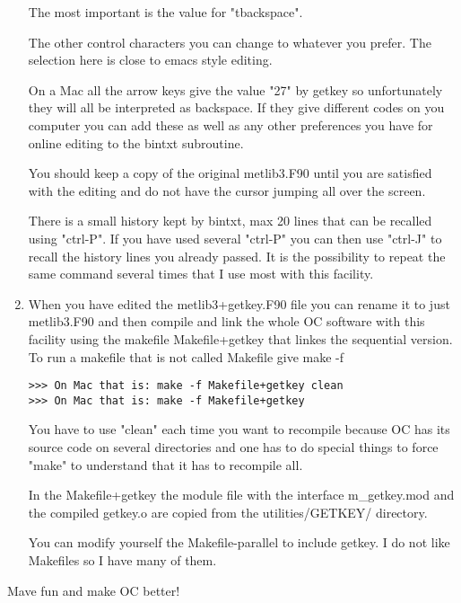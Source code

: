 \documentclass[12pt]{article}
\begin{document}
\begin{enumerate}
The most important is the value for "tbackspace".

The other control characters you can change to whatever you prefer.
The selection here is close to emacs style editing.

On a Mac all the arrow keys give the value "27" by getkey so
unfortunately they will all be interpreted as backspace.  If they give
different codes on you computer you can add these as well as any other
preferences you have for online editing to the bintxt subroutine.

You should keep a copy of the original metlib3.F90 until you are
satisfied with the editing and do not have the cursor jumping all over
the screen.

There is a small history kept by bintxt, max 20 lines that can be
recalled using "ctrl-P".  If you have used several "ctrl-P" you can
then use "ctrl-J" to recall the history lines you already passed.  It
is the possibility to repeat the same command several times that I use
most with this facility.

\item When you have edited the metlib3+getkey.F90 file you can
rename it to just metlib3.F90 and then compile and link the whole OC
software with this facility using the makefile Makefile+getkey that
linkes the sequential version.  To run a makefile that is not called
Makefile give make -f

\begin{verbatim}
>>> On Mac that is: make -f Makefile+getkey clean
>>> On Mac that is: make -f Makefile+getkey
\end{verbatim}


You have to use "clean" each time you want to recompile because OC has
its source code on several directories and one has to do special
things to force "make" to understand that it has to recompile all.

In the Makefile+getkey the module file with the interface m\_getkey.mod
and the compiled getkey.o are copied from the utilities/GETKEY/
directory.

You can modify yourself the Makefile-parallel to include getkey.  I do
not like Makefiles so I have many of them.
\end{enumerate}

Mave fun and make OC better!
\end{document}
